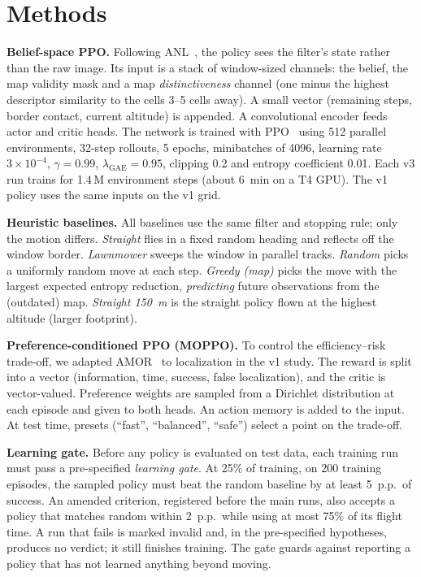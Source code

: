 \section{Methods}
\label{sec:methods}

\textbf{Belief-space PPO.}
Following ANL~\cite{chaplot2018anl}, the policy sees the filter's state rather than the raw image. Its input is a stack of window-sized channels: the belief, the map validity mask and a map \emph{distinctiveness} channel (one minus the highest descriptor similarity to the cells 3--5 cells away). A small vector (remaining steps, border contact, current altitude) is appended. A convolutional encoder feeds actor and critic heads. The network is trained with PPO~\cite{schulman2017ppo} using 512 parallel environments, 32-step rollouts, 5 epochs, minibatches of 4096, learning rate $3\times10^{-4}$, $\gamma=0.99$, $\lambda_{\text{GAE}}=0.95$, clipping 0.2 and entropy coefficient 0.01. Each v3 run trains for 1.4\,M environment steps (about 6~min on a T4 GPU). The v1 policy uses the same inputs on the v1 grid.

\textbf{Heuristic baselines.}
All baselines use the same filter and stopping rule; only the motion differs.
\emph{Straight} flies in a fixed random heading and reflects off the window border.
\emph{Lawnmower} sweeps the window in parallel tracks.
\emph{Random} picks a uniformly random move at each step.
\emph{Greedy (map)} picks the move with the largest expected entropy reduction, \emph{predicting} future observations from the (outdated) map.
\emph{Straight 150~m} is the straight policy flown at the highest altitude (larger footprint).

\textbf{Preference-conditioned PPO (MOPPO).}
To control the efficiency--risk trade-off, we adapted AMOR~\cite{alegre2025amor} to localization in the v1 study. The reward is split into a vector (information, time, success, false localization), and the critic is vector-valued. Preference weights are sampled from a Dirichlet distribution at each episode and given to both heads. An action memory is added to the input. At test time, presets (``fast'', ``balanced'', ``safe'') select a point on the trade-off.

\textbf{Learning gate.}
Before any policy is evaluated on test data, each training run must pass a pre-specified \emph{learning gate}. At 25\% of training, on 200 training episodes, the sampled policy must beat the random baseline by at least 5~p.p.\ of success. An amended criterion, registered before the main runs, also accepts a policy that matches random within 2~p.p.\ while using at most 75\% of its flight time. A run that fails is marked invalid and, in the pre-specified hypotheses, produces no verdict; it still finishes training. The gate guards against reporting a policy that has not learned anything beyond moving.
